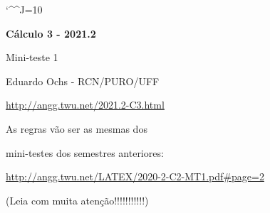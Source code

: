 \documentclass[oneside,12pt]{article}
\begin{document}
\catcode`\^^J=10

\pu

\pu




\def\drafturl{http://angg.twu.net/LATEX/2021-2-C3.pdf}
\def\drafturl{http://angg.twu.net/2021.2-C3.html}
\def\draftfooter{\tiny \href{\drafturl}{\jobname{}} \ColorBrown{\shorttoday{} \hours}}



%

\thispagestyle{empty}

\begin{center}

\vspace*{1.2cm}

{\bf \Large Cálculo 3 - 2021.2}

\bsk

Mini-teste 1

\bsk

Eduardo Ochs - RCN/PURO/UFF

\url{http://angg.twu.net/2021.2-C3.html}

\end{center}

\newpage

As regras vão ser as mesmas dos

mini-testes dos semestres anteriores:

\ssk

{\footnotesize

\url{http://angg.twu.net/LATEX/2020-2-C2-MT1.pdf#page=2}

}

(Leia com muita atenção!!!!!!!!!!!)

\bsk
\end{document}
